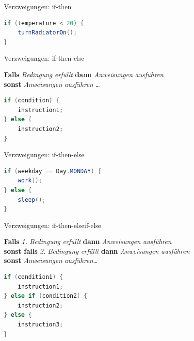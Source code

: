 \documentclass[18pt]{beamer}
\begin{document}
\begin{frame}[fragile]{Verzweigungen: if-then}
    \begin{exampleblock}{}
        \begin{lstlisting}[language=Java]
if (temperature < 20) {
    turnRadiatorOn();
}
        \end{lstlisting}
    \end{exampleblock}
\end{frame}

\begin{frame}[fragile]{Verzweigungen: if-then-else}
    \begin{block}{}
        \textbf{Falls} \textit{Bedingung erfüllt} \textbf{dann} \textit{Anweisungen ausführen}\\
        \textbf{sonst} \textit{Anweisungen ausführen} \dots
    \end{block}
    \pause

    \begin{block}{}
        \begin{lstlisting}[language=Java]
if (condition) {
    instruction1;
} else {
    instruction2;
}
        \end{lstlisting}
    \end{block}
\end{frame}

\begin{frame}[fragile]{Verzweigungen: if-then-else}
    \begin{exampleblock}{}
        \begin{lstlisting}[language=Java]
if (weekday == Day.MONDAY) {
    work();
} else {
    sleep();
}
        \end{lstlisting}
    \end{exampleblock}
\end{frame}

\begin{frame}[fragile]{Verzweigungen: if-then-elseif-else}
    \begin{block}{}
        \textbf{Falls} \textit{1. Bedingung erfüllt} \textbf{dann} \textit{Anweisungen ausführen}\\
        \textbf{sonst falls} \textit{2. Bedingung erfüllt} \textbf{dann} \textit{Anweisungen ausführen}\\
        \textbf{sonst} \textit{Anweisungen ausführen}\dots
    \end{block}
    \pause

    \begin{block}{}
        \begin{lstlisting}[language=Java]
if (condition1) {
    instruction1;
} else if (condition2) {
    instruction2;
} else {
    instruction3;
}
        \end{lstlisting}
    \end{block}
\end{frame}
\end{document}
